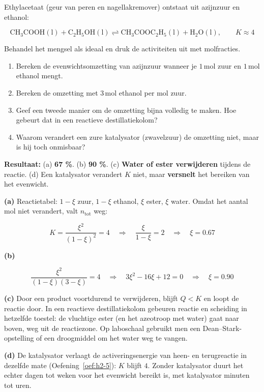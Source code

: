 \begin{oefening}
Ethylacetaat (geur van peren en nagellakremover) ontstaat uit azijnzuur en ethanol:

\[
\mathrm{CH_3COOH(l) + C_2H_5OH(l) \rightleftharpoons CH_3COOC_2H_5(l) + H_2O(l)}, \qquad K \approx 4
\]

Behandel het mengsel als ideaal en druk de activiteiten uit met molfracties.

\begin{enumerate}
\item[(a)]
  Bereken de evenwichtsomzetting van azijnzuur wanneer je \(1\,\mathrm{mol}\) zuur en \(1\,\mathrm{mol}\) ethanol mengt.
\item[(b)]
  Bereken de omzetting met \(3\,\mathrm{mol}\) ethanol per mol zuur.
\item[(c)]
  Geef een tweede manier om de omzetting bijna volledig te maken. Hoe gebeurt dat in een reactieve destillatiekolom?
\item[(d)]
  Waarom verandert een zure katalysator (zwavelzuur) de omzetting niet, maar is hij toch onmisbaar?
\end{enumerate}
\end{oefening}
\begin{oplossing}
\textbf{Resultaat:} (a) \textbf{67 \%}. (b) \textbf{90 \%}. (c) \textbf{Water of ester verwijderen} tijdens de reactie. (d) Een katalysator verandert \(K\) niet, maar \textbf{versnelt} het bereiken van het evenwicht.

\textbf{(a)} Reactietabel: \(1-\xi\) zuur, \(1-\xi\) ethanol, \(\xi\) ester, \(\xi\) water. Omdat het aantal mol niet verandert, valt \(n_{\text{tot}}\) weg:

\[
K = \frac{\xi^2}{(1-\xi)^2} = 4 \quad\Rightarrow\quad \frac{\xi}{1-\xi} = 2 \quad\Rightarrow\quad \xi = 0.67
\]

\textbf{(b)}

\[
\frac{\xi^2}{(1-\xi)(3-\xi)} = 4 \quad\Rightarrow\quad 3\xi^2 - 16\xi + 12 = 0 \quad\Rightarrow\quad \xi = 0.90
\]

\textbf{(c)} Door een product voortdurend te verwijderen, blijft \(Q < K\) en loopt de reactie door. In een reactieve destillatiekolom gebeuren reactie en scheiding in hetzelfde toestel: de vluchtige ester (en het azeotroop met water) gaat naar boven, weg uit de reactiezone. Op laboschaal gebruikt men een Dean--Stark-opstelling of een droogmiddel om het water weg te vangen.

\textbf{(d)} De katalysator verlaagt de activeringsenergie van heen- en terugreactie in dezelfde mate (Oefening~\ref{oef:h2-5}): \(K\) blijft \(4\). Zonder katalysator duurt het echter dagen tot weken voor het evenwicht bereikt is, met katalysator minuten tot uren.
\end{oplossing}

